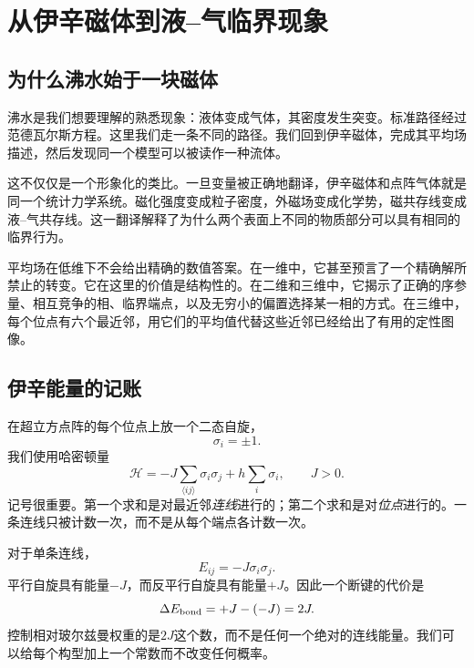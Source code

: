 \chapter{从伊辛磁体到液--气临界现象}


\section{为什么沸水始于一块磁体}

沸水是我们想要理解的熟悉现象：液体变成气体，其密度发生突变。标准路径经过范德瓦尔斯方程。这里我们走一条不同的路径。我们回到伊辛磁体，完成其平均场描述，然后发现同一个模型可以被读作一种流体。

这不仅仅是一个形象化的类比。一旦变量被正确地翻译，伊辛磁体和点阵气体就是同一个统计力学系统。磁化强度变成粒子密度，外磁场变成化学势，磁共存线变成液--气共存线。这一翻译解释了为什么两个表面上不同的物质部分可以具有相同的临界行为。

平均场在低维下不会给出精确的数值答案。在一维中，它甚至预言了一个精确解所禁止的转变。它在这里的价值是结构性的。在二维和三维中，它揭示了正确的序参量、相互竞争的相、临界端点，以及无穷小的偏置选择某一相的方式。在三维中，每个位点有六个最近邻，用它们的平均值代替这些近邻已经给出了有用的定性图像。

\section{伊辛能量的记账}

在超立方点阵的每个位点上放一个二态自旋，
\begin{equation}
\sigma_i=\pm1.
\end{equation}
我们使用哈密顿量
\begin{equation}
\mathcal H
=-J\sum_{\langle ij\rangle}\sigma_i\sigma_j
+h\sum_i\sigma_i,
\qquad J>0.
\label{eq:ising-hamiltonian}
\end{equation}
记号很重要。第一个求和是对最近邻\emph{连线}进行的；第二个求和是对\emph{位点}进行的。一条连线只被计数一次，而不是从每个端点各计数一次。

对于单条连线，
\begin{equation}
E_{ij}=-J\sigma_i\sigma_j.
\end{equation}
平行自旋具有能量\(-J\)，而反平行自旋具有能量\(+J\)。因此一个断键的代价是
\begin{equation}
\Delta E_{\rm bond}=+J-(-J)=2J.
\label{eq:broken-bond}
\end{equation}
控制相对玻尔兹曼权重的是\(2J\)这个数，而不是任何一个绝对的连线能量。我们可以给每个构型加上一个常数而不改变任何概率。

